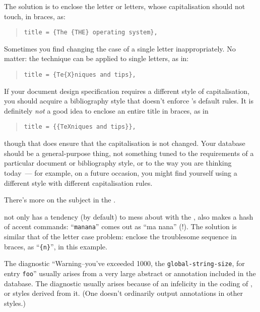 The solution is to enclose the letter or letters, whose capitalisation
\BibTeX{} should not touch, in braces, as:
\begin{quote}
\begin{verbatim}
title = {The {THE} operating system},
\end{verbatim}
\end{quote}
Sometimes you find \BibTeX{} changing the case of a single letter
inappropriately.  No matter: the technique can be applied to single
letters, as in:
\begin{quote}
\begin{verbatim}
title = {Te{X}niques and tips},
\end{verbatim}
\end{quote}
If your document design specification requires a different style of
capitalisation, you should acquire a bibliography style that doesn't
enforce \BibTeX{}'s default rules.  It is definitely \emph{not} a good
idea to enclose an entire title in braces, as in
\begin{quote}
\begin{verbatim}
title = {{TeXniques and tips}},
\end{verbatim}
\end{quote}
though that does ensure that the capitalisation is not changed.  Your
\BibTeX{} database should be a general-purpose thing, not something
tuned to the requirements of a particular document or bibliography
style, or to the way you are thinking today~--- for example, on a
future occasion, you might find yourself using a different \BibTeX{}
style with different capitalisation rules.

There's more on the subject in the
.


\BibTeX{} not only has a tendency (by default) to mess about with the
,
also makes a hash of accent commands:
``\texttt{ma}\csx{\textasciitilde}\texttt{nana}'' comes out as ``ma
nana'' (!).  The solution is similar that of the letter case problem:
enclose the troublesome sequence in braces, as
``\texttt{\{}\csx{\textasciitilde}\texttt{n\}}'', in this example.


The \BibTeX{} diagnostic ``Warning--you've exceeded 1000, the
\texttt{global-string-size}, for entry \texttt{foo}'' usually arises
from a very large abstract or annotation included in the database.
The diagnostic usually arises because of an infelicity in the coding of
, or styles derived from it.  (One doesn't
ordinarily output annotations in other styles.)

